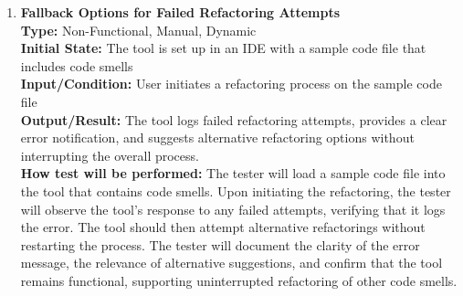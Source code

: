 \documentclass[12pt, titlepage]{article}
\begin{document}
\begin{enumerate}[label={\bf \textcolor{Maroon}{test-PF-\arabic*}}, wide=0pt, font=\itshape]
  \item \textbf{Fallback Options for Failed Refactoring Attempts} \\[2mm]
    \textbf{Type:} Non-Functional, Manual, Dynamic \\
    \textbf{Initial State:} The tool is set up in an IDE with a sample code file that includes code smells \\
    \textbf{Input/Condition:} User initiates a refactoring process on the sample code file \\
    \textbf{Output/Result:} The tool logs failed refactoring attempts, provides a clear error notification, and suggests alternative refactoring options without interrupting the overall process. \\[2mm]
    \textbf{How test will be performed:} The tester will load a sample code file into the tool that contains code smells. Upon initiating the refactoring, the tester will observe the tool’s response to any failed attempts, verifying that it logs the error. The tool should then attempt alternative refactorings without restarting the process. The tester will document the clarity of the error message, the relevance of alternative suggestions, and confirm that the tool remains functional, supporting uninterrupted refactoring of other code smells.
  


\end{enumerate}
\end{document}
